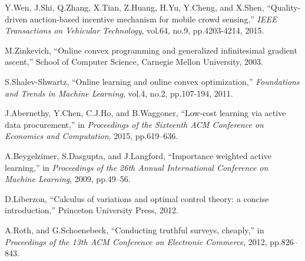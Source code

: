 \documentclass[10pt,conference,compsocconf,letterpaper]{IEEEtran}
\begin{document}
\begin{thebibliography}{99}
Y.Wen, J.Shi, Q.Zhang, X.Tian, Z.Huang, H.Yu, Y.Cheng, and X.Shen, ``Quality-driven auction-based incentive mechanism for mobile crowd sensing,'' \emph{IEEE Transactions on Vehicular Technology}, vol.64, no.9, pp.4203-4214, 2015.

M.Zinkevich, ``Online convex programming and generalized infinitesimal gradient ascent,'' School of Computer Science, Carnegie Mellon University, 2003.

S.Shalev-Shwartz, ``Online learning and online convex optimization,'' \emph{Foundations and Trends in Machine Learning}, vol.4, no.2, pp.107-194, 2011.

J.Abernethy, Y.Chen, C.J.Ho, and B.Waggoner, ``Low-cost learning via active data procurement,'' in \emph{Proceedings of the Sixteenth ACM Conference on Economics and Computation}, 2015, pp.619--636.

A.Beygelzimer, S.Dasgupta, and J.Langford, ``Importance weighted active learning,'' in \emph{Proceedings of the 26th Annual International Conference on Machine Learning}, 2009, pp.49--56.

D.Liberzon, ``Calculus of variations and optimal control theory: a concise introduction,'' Princeton University Press, 2012.

A.Roth, and G.Schoenebeck, ``Conducting truthful surveys, cheaply,'' in \emph{Proceedings of the 13th ACM Conference on Electronic Commerce}, 2012, pp.826--843.



\end{thebibliography}
\end{document}
